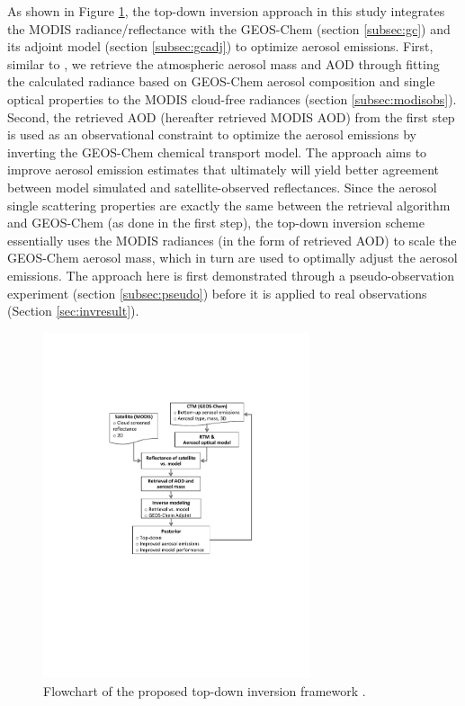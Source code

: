  As shown in Figure \ref{fig:flowchat}, the top-down inversion approach in 
this study integrates the MODIS radiance/reflectance with the GEOS-Chem 
(section \ref{subsec:gc}) and its adjoint model (section \ref{subsec:gcadj}) 
to optimize aerosol emissions. First, similar to \citet{Wang10}, we retrieve
the atmospheric aerosol mass and AOD through fitting the calculated radiance
based on GEOS-Chem aerosol composition and single optical properties to the 
MODIS cloud-free radiances (section \ref{subsec:modisobs}). Second, the 
retrieved AOD (hereafter retrieved MODIS AOD) from the first step is used as 
an observational constraint to optimize the aerosol emissions by inverting the
GEOS-Chem chemical transport model. The approach aims to improve aerosol 
emission estimates that ultimately will yield better agreement between model
simulated and satellite-observed reflectances.  Since the aerosol single 
scattering properties are exactly the same between the retrieval algorithm and
GEOS-Chem (as done in the first step), the top-down inversion scheme 
essentially uses the MODIS radiances (in the form of retrieved AOD) to scale 
the GEOS-Chem aerosol mass, which in turn are used to optimally adjust  the 
aerosol emissions. The approach here is first demonstrated through a 
pseudo-observation experiment (section \ref{subsec:pseudo}) before it is 
applied to real observations (Section \ref{sec:invresult}).

 \begin{figure}[t]
  \centering
  \includegraphics[width={0.7\textwidth}]{figures/a1.pdf}
  \caption{Flowchart of the proposed top-down inversion framework \citep{Xu13}.}
  \label{fig:flowchat}
 \end{figure}

